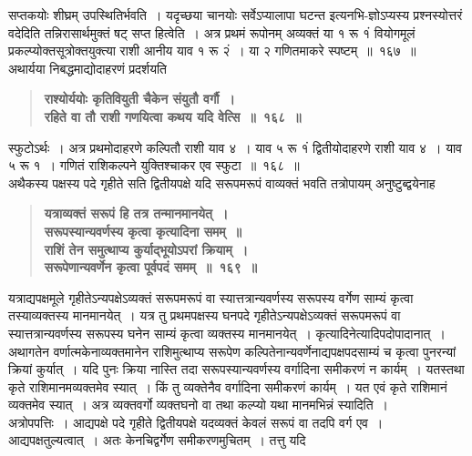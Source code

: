 \documentclass[11pt, openany]{book}
\begin{document}
\newpage

\begin{sloppypar}
\noindent सप्तकयोः शीघ्रम् उपस्थितिर्भवति~। यदृच्छया चानयोः सर्वेऽप्यालापा घटन्त इत्यनभि-ज्ञोऽप्यस्य प्रश्नस्योत्तरं वदेदिति तन्निरासार्थमुक्तं षट् सप्त हित्वेति~। अत्र प्रथमं रूपोनम् अव्यक्तं या १ रू १ं वियोगमूलं प्रकल्प्योक्तसूत्रोक्तयुक्त्या राशी आनीय याव १ रू २ं~। या २ गणितमाकरे स्पष्टम्~॥~१६७~॥\\

{\small अथार्यया निबद्धमाद्योदाहरणं प्रदर्शयति\textendash }

 \label{10.168}
\begin{quote}
{\large \textbf{{\color{purple}राश्योर्ययोः कृतिवियुती चैकेन संयुतौ वर्गौ~।\\
रहिते वा तौ राशी गणयित्वा कथय यदि वेत्सि~॥~१६८~॥}}}
\end{quote}

स्फुटोऽर्थः~। अत्र प्रथमोदाहरणे कल्पितौ राशी याव ४~। याव ५ रू १ं द्वितीयोदाहरणे राशी याव ४~। याव ५ रू १~। गणितं राशिकल्पने युक्तिश्चाकर एव स्फुटा~॥~१६८~॥\\

{\small अथैकस्य पक्षस्य पदे गृहीते सति द्वितीयपक्षे यदि सरूपमरूपं वाव्यक्तं भवति तत्रोपायम् अनुष्टुब्द्वयेनाह\textendash }

 \label{10.169}
\begin{quote}
{\large \textbf{{\color{purple}यत्राव्यक्तं सरूपं हि तत्र तन्मानमानयेत्~।\\
सरूपस्यान्यवर्णस्य कृत्वा कृत्यादिना समम्~॥\\
राशिं तेन समुत्थाप्य कुर्याद्भूयोऽपरां क्रियाम्~।\\
सरूपेणान्यवर्णेन कृत्वा पूर्वपदं समम्~॥~१६९~॥}}}
\end{quote}

यत्राद्यपक्षमूले गृहीतेऽन्यपक्षेऽव्यक्तं सरूपमरूपं वा स्यात्तत्रान्यवर्णस्य सरूपस्य वर्गेण साम्यं कृत्वा तस्याव्यक्तस्य मानमानयेत्~। यत्र तु प्रथमपक्षस्य घनपदे गृहीतेऽन्यपक्षेऽव्यक्तं सरूपमरूपं वा स्यात्तत्रान्यवर्णस्य सरूपस्य घनेन साम्यं कृत्वा व्यक्तस्य मानमानयेत्~। कृत्यादिनेत्यादिपदोपादानात्~। अथागतेन वर्णात्मकेनाव्यक्तमानेन राशिमुत्थाप्य सरूपेण कल्पितेनान्यवर्णेनाद्यपक्षपदसाम्यं च कृत्वा पुनरन्यां क्रियां कुर्यात्~। यदि पुनः क्रिया नास्ति तदा सरूपस्यान्यवर्णस्य वर्गादिना समीकरणं न कार्यम्~। यतस्तथा कृते राशिमानमव्यक्तमेव स्यात्~। किं तु व्यक्तेनैव वर्गादिना समीकरणं कार्यम्~। यत एवं कृते राशिमानं व्यक्तमेव स्यात्~। अत्र व्यक्तवर्गो व्यक्तघनो वा तथा कल्प्यो यथा मानमभिन्नं स्यादिति~।\\

अत्रोपपत्तिः~। आद्यपक्षे पदे गृहीते द्वितीयपक्षे यदव्यक्तं केवलं सरूपं वा तदपि वर्ग एव~। आद्यपक्षतुल्यत्वात्~। अतः केनचिद्वर्गेण समीकरणमुचितम्~। तत्तु यदि
\end{sloppypar}
\end{document}
